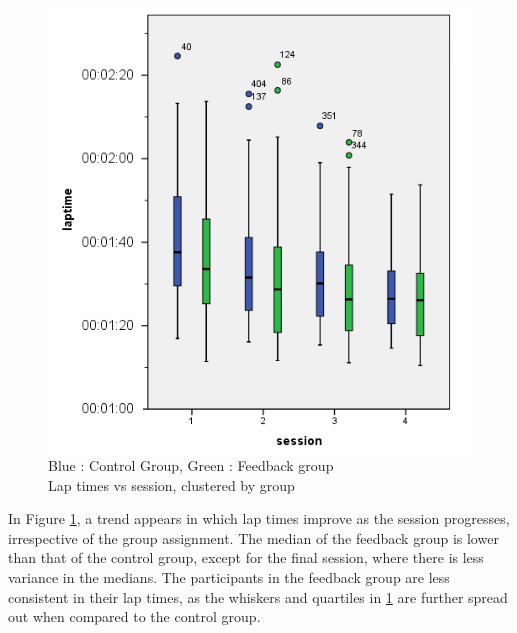 \begin{figure}[!htb]
	\centering
	\includegraphics[width=\textwidth]{charts/laptimes.png}
	\caption[Lap times vs session, clustered by group]{Blue : Control Group, Green : Feedback group \\ Lap times vs session, clustered by group}
	\label{fig:chart-laptimes}
\end{figure}

In Figure \ref{fig:chart-laptimes}, a trend appears in which lap times improve as the session progresses, irrespective of the group assignment. The median of the feedback group is lower than that of the control group, except for the final session, where there is less variance in the medians. The participants in the feedback group are less consistent in their lap times, as the whiskers and quartiles in \ref{fig:chart-laptimes} are further spread out when compared to the control group.
%


